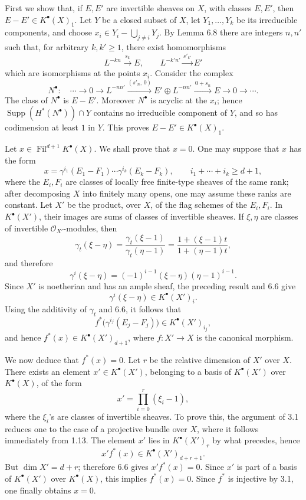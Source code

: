 \documentclass[11pt]{article}
\newcommand{\Fil}{\operatorname{Fil}}
\providecommand{\Supp}{\operatorname{Supp}}
\begin{document}
First we show that, if \(E,E'\) are invertible sheaves on \(X\), with classes \(E,E'\), then \(E-E'\in K^\bullet(X)_1\). Let \(Y\) be a closed subset of \(X\), let \(Y_1,\ldots,Y_k\) be its irreducible components, and choose \(x_i\in Y_i-\bigcup_{j\neq i}Y_j\). By Lemma 6.8 there are integers \(n,n'\) such that, for arbitrary \(k,k'\geq1\), there exist homomorphisms
\[
  L^{-kn}\xrightarrow{s_k}E,\qquad
  L^{-k'n'}\xrightarrow{s'_{k'}}E'
\]
which are isomorphisms at the points \(x_i\). Consider the complex
\[
  N^\bullet:\quad
  \cdots\longrightarrow 0\longrightarrow
  L^{-nn'}\xrightarrow{(s'_n,\,0)}
  E'\oplus L^{-nn'}\xrightarrow{\,0+s_n\,}
  E\longrightarrow 0\longrightarrow\cdots .
\]
The class of \(N^\bullet\) is \(E-E'\). Moreover \(N^\bullet\) is acyclic at the \(x_i\); hence \(\Supp(H^*(N^\bullet))\cap Y\) contains no irreducible component of \(Y\), and so has codimension at least \(1\) in \(Y\). This proves \(E-E'\in K^\bullet(X)_1\).

Let \(x\in \Fil^{d+1}K^\bullet(X)\). We shall prove that \(x=0\). One may suppose that \(x\) has the form
\[
  x=\gamma^{i_1}(E_1-F_1)\cdots\gamma^{i_k}(E_k-F_k),
  \qquad i_1+\cdots+i_k\geq d+1,
\]
where the \(E_i,F_i\) are classes of locally free finite-type sheaves of the same rank; after decomposing \(X\) into finitely many opens, one may assume these ranks are constant. Let \(X'\) be the product, over \(X\), of the flag schemes of the \(E_i,F_i\). In \(K^\bullet(X')\), their images are sums of classes of invertible sheaves. If \(\xi,\eta\) are classes of invertible \(\mathcal O_{X'}\)-modules, then
\[
  \gamma_t(\xi-\eta)
  =
  \frac{\gamma_t(\xi-1)}{\gamma_t(\eta-1)}
  =
  \frac{1+(\xi-1)t}{1+(\eta-1)t},
\]
and therefore
\[
  \gamma^i(\xi-\eta)=(-1)^{i-1}(\xi-\eta)(\eta-1)^{i-1}.
\]
Since \(X'\) is noetherian and has an ample sheaf, the preceding result and 6.6 give
\[
  \gamma^i(\xi-\eta)\in K^\bullet(X')_i.
\]
Using the additivity of \(\gamma_t\) and 6.6, it follows that
\[
  f^*\bigl(\gamma^{i_j}(E_j-F_j)\bigr)\in K^\bullet(X')_{i_j},
\]
and hence \(f^*(x)\in K^\bullet(X')_{d+1}\), where \(f:X'\to X\) is the canonical morphism.

We now deduce that \(f^*(x)=0\). Let \(r\) be the relative dimension of \(X'\) over \(X\). There exists an element \(x'\in K^\bullet(X')\), belonging to a basis of \(K^\bullet(X')\) over \(K^\bullet(X)\), of the form
\[
  x'=\prod_{i=0}^{r}(\xi_i-1),
\]
where the \(\xi_i\)'s are classes of invertible sheaves. To prove this, the argument of 3.1 reduces one to the case of a projective bundle over \(X\), where it follows immediately from 1.13. The element \(x'\) lies in \(K^\bullet(X')_r\) by what precedes, hence
\[
  x'f^*(x)\in K^\bullet(X')_{d+r+1}.
\]
But \(\dim X'=d+r\); therefore 6.6 gives \(x'f^*(x)=0\). Since \(x'\) is part of a basis of \(K^\bullet(X')\) over \(K^\bullet(X)\), this implies \(f^*(x)=0\). Since \(f^*\) is injective by 3.1, one finally obtains \(x=0\).
\end{document}
